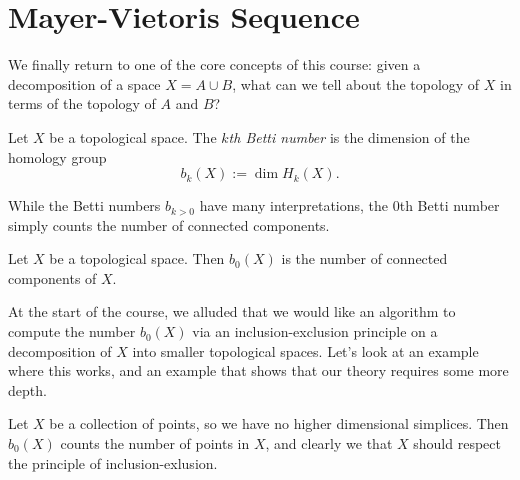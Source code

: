 \section{Mayer-Vietoris Sequence}
We finally return to one of the core concepts of this course: given a decomposition of a space $X=A\cup B$, what can we tell about the topology of $X$ in terms of the topology of $A$ and $B$? 
\begin{definition}
Let $X$ be a topological space. The \emph{$k$th Betti number} is the dimension of the homology group 
\[b_k(X):=\dim H_k(X). \]
\end{definition}
While the Betti numbers $b_{k>0}$ have many interpretations, the $0$th Betti number simply counts the number of connected components. 
\begin{claim}
Let $X$ be a topological space. Then $b_0(X)$ is the number of connected components of $X$. 
\end{claim}
At the start of the course, we alluded that we would like an algorithm to compute the number $b_0(X)$ via an inclusion-exclusion principle on a decomposition of $X$ into smaller topological spaces. Let's look at an example where this works, and an example that shows that our theory requires some more depth. 
\begin{example}
Let $X$ be a collection of points, so we have no higher dimensional simplices. Then $b_0(X)$ counts the number of points in $X$, and clearly we that $X$ should respect the principle of inclusion-exlusion. 
\end{example}

